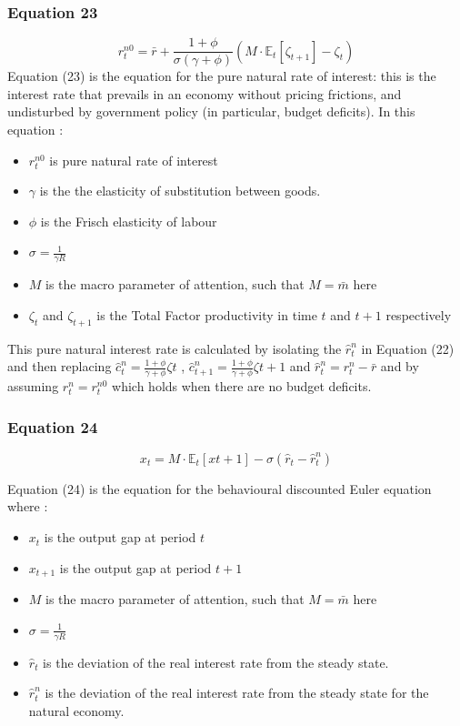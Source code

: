 \documentclass{article}
\begin{document}
\subsubsection*{Equation 23}
\begin{equation}
    r^{n0}_{t}=\bar{r}+\frac{1+\phi}{\sigma(\gamma+\phi)}\left(M\cdot\mathbb{E}_{t}\left[\zeta_{t+1}\right]-\zeta_{t}\right)
\end{equation}
Equation (23) is the equation for the pure natural rate of interest: this is the interest rate that prevails in an economy without pricing frictions, and undisturbed by government policy (in particular, budget deficits). In this equation : 
\begin{itemize}
    \item $r^{n0}_{t}$ is pure natural rate of interest
    \item $\gamma$ is the the elasticity of substitution between goods. 
    \item $\phi$ is the Frisch elasticity of labour
    \item $\sigma=\frac{1}{\gamma R}$ 
    \item $M$ is the macro parameter of attention, such that $M=\bar{m}$ here
    \item $\zeta_{t}$  and $\zeta_{t+1}$ is the Total Factor productivity in time $t$ and $t+1$ 
        respectively
\end{itemize}
    
This pure natural interest rate is calculated by isolating the $\hat r_{t}^{n}$ in Equation (22) and then replacing $\hat{c}_{t}^{n}=\frac{1+\phi}{\gamma+\phi}\zeta{t}$ , $\hat{c}_{t+1}^{n}=\frac{1+\phi}{\gamma+\phi}\zeta{t+1}$ and $\hat r_{t}^{n}=r_{t}^{n}-\bar{r}$ and by assuming $r_{t}^{n}=r^{n0}_{t}$ which holds when there are no budget deficits. 

\subsubsection*{Equation 24}
\begin{equation}
    x_{t}=M\cdot\mathbb{E}_{t}\left[x{t+1}\right]-\sigma(\hat{r}_{t}-\hat{r}^{n}_{t})
\end{equation}

Equation (24) is the equation for the behavioural discounted Euler equation where : 
\begin{itemize}
    \item $x_{t}$ is the output gap at period $t$
    \item $x_{t+1}$ is the output gap at period $t+1$
    \item $M$ is the macro parameter of attention, such that $M=\bar{m}$ here
    \item $\sigma=\frac{1}{\gamma R}$ 
    \item $\hat r_{t}$ is the deviation of the real interest rate from the steady state.
    \item $\hat r_{t}^{n}$ is the deviation of the real interest rate from the steady state for the natural economy.
\end{itemize}
\end{document}
